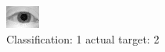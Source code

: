 \begin{figure}[h!]
\begin{center}
\includegraphics[width=0.60\columnwidth]{figures/ID938_class_1_target_2.png}
\end{center}
\caption{ Classification: 1 actual target: 2}
\label{fig:ID938_class_1_target_2}
\end{figure}

